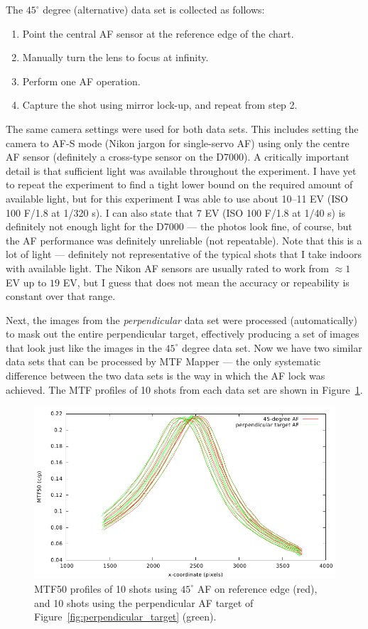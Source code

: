 \documentclass[a4paper]{article}
\begin{document}
The $45^\circ$ degree (alternative) data set is collected as follows:
\begin{enumerate}
  \item Point the central AF sensor at the reference edge of the chart.
  \item Manually turn the lens to focus at infinity.
  \item Perform one AF operation.
  \item Capture the shot using mirror lock-up, and repeat from step 2.
\end{enumerate}

The same camera settings were used for both data sets. This includes setting
the camera to AF-S mode (Nikon jargon for single-servo AF) using only the 
centre AF sensor (definitely a cross-type sensor on the D7000). A critically
important detail is that sufficient light was available throughout the
experiment. I have yet to repeat the experiment to find a tight
lower bound on the required amount of available light, but for this experiment I was
able to use about 10--11 EV (ISO 100 F/1.8 at 1/320 s). I can
also state that 7 EV (ISO 100 F/1.8 at 1/40 s) is definitely not enough light for the
D7000 --- the photos look fine, of course, but the AF performance was
definitely unreliable (not repeatable).
Note that this is a lot of light --- definitely not
representative of the typical shots that I take indoors with available
light. The Nikon AF sensors are usually rated to work from $\approx1$ EV up to
$19$ EV, but I guess that does not mean the accuracy or repeability is
constant over that range.

Next, the images from the \emph{perpendicular} data set were processed
(automatically) to mask out the entire perpendicular target, effectively
producing a set of images that look just like the images in the $45^\circ$
degree data set. Now we have two similar data sets that can be processed 
by MTF Mapper --- the only systematic difference between the two data sets
is the way in which the AF lock was achieved. The MTF profiles of 10 shots
from each data set are shown in Figure~\ref{fig:perpendicular_profiles}.

\begin{figure}
  \centering
  \includegraphics{figures/perpendicular_profiles}
  \caption{MTF50 profiles of 10 shots using $45^\circ$ AF on reference edge
  (red),  and 10 shots using the perpendicular AF target of
  Figure~\ref{fig:perpendicular_target} (green).}
  \label{fig:perpendicular_profiles}
\end{figure}
\end{document}

